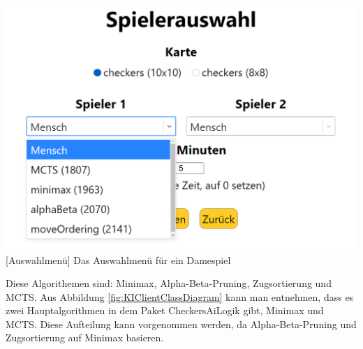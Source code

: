 \documentclass[12pt,a4paper,bibliography=totocnumbered,listof=totocnumbered]{article}
\begin{document}
\vspace{1em}
\begin{minipage}{\linewidth}
	\centering
	\includegraphics[width=0.7\linewidth]{pics/AlgorithmeninderApplikation.png}
	[Auswahlmenü]{ Das Auswahlmenü für ein Damespiel }
	\label{fig:Auswahlmenue}
\end{minipage}

Diese Algorithemen sind: Minimax, Alpha-Beta-Pruning, Zugsortierung und MCTS.
Aus Abbildung \ref{fig:KIClientClassDiagram}
kann man entnehmen, dass es zwei Hauptalgorithmen in dem Paket CheckersAiLogik gibt, Minimax und MCTS. Diese Aufteilung kann vorgenommen werden,
da Alpha-Beta-Pruning und Zugsortierung auf Minimax basieren.
\end{document}
